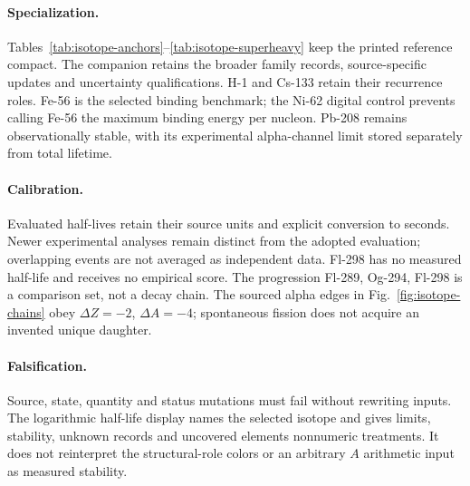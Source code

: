 \paragraph{Specialization.}
Tables~\ref{tab:isotope-anchors}--\ref{tab:isotope-superheavy} keep the printed reference
compact. The companion retains the broader family records, source-specific updates and
uncertainty qualifications. H-1 and Cs-133 retain their recurrence roles. Fe-56 is the
selected binding benchmark; the Ni-62 digital control prevents calling Fe-56 the maximum
binding energy per nucleon. Pb-208 remains observationally stable, with its experimental
alpha-channel limit stored separately from total lifetime.






\paragraph{Calibration.}
Evaluated half-lives retain their source units and explicit conversion to seconds.
Newer experimental analyses remain distinct from the adopted evaluation; overlapping
events are not averaged as independent data. Fl-298 has no measured half-life and receives
no empirical score. The progression Fl-289, Og-294, Fl-298 is a comparison set, not a decay
chain. The sourced alpha edges in Fig.~\ref{fig:isotope-chains} obey \(\Delta Z=-2\),
\(\Delta A=-4\); spontaneous fission does not acquire an invented unique daughter.

\paragraph{Falsification.}
Source, state, quantity and status mutations must fail without rewriting inputs.
The logarithmic half-life display names the selected isotope and gives limits, stability,
unknown records and uncovered elements nonnumeric treatments. It does not reinterpret
the structural-role colors or an arbitrary \(A\) arithmetic input as measured stability.


